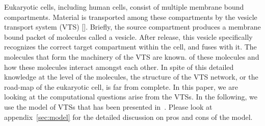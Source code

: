 
Eukaryotic cells, including human cells, consist of multiple membrane bound compartments.
Material is transported among these compartments by the vesicle transport system (VTS) []. Briefly,
the source compartment produces a membrane bound packet of molecules called a vesicle. After
release, this vesicle specifically recognizes the correct target compartment within the cell, and fuses
with it. The molecules that form the machinery of the VTS are known.  of these molecules and how these molecules interact amongst each other. In spite of this detailed knowledge at the level of the molecules, the structure of the VTS network, or the road-map of the eukaryotic cell, is far from complete. 
% 
%
%
%
%
%
In this paper, we are looking at the computational questions 
arise from the VTSs.
%
In the following, we use the model of VTSs that has been presented
in~\cite{VTS}.
%
Please look at appendix~\ref{sec:model}
for the detailed discussion on pros and cons of the model.

